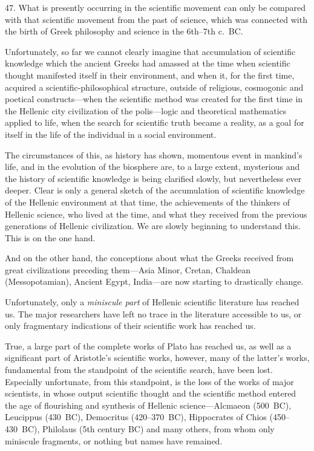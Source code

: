 
47. What is presently occurring in the scientific movement can only be compared
with that scientific movement from the past of science, which was connected
with the birth of Greek philosophy and science in the 6th--7th c.~BC.

Unfortunately, so far we cannot clearly imagine that accumulation of scientific
knowledge which the ancient Greeks had amassed at the time when scientific
thought manifested itself in their environment, and when it, for the first
time, acquired a scientific-philosophical structure, outside of religious,
cosmogonic and poetical constructs---when the scientific method was created for
the first time in the Hellenic city civilization of the polis---logic and
theoretical mathematics applied to life, when the search for scientific truth
became a reality, as a goal for itself in the life of the individual in a
social environment.

The circumstances of this, as history has shown, momentous event in mankind's
life, and in the evolution of the biosphere are, to a large extent, mysterious
and the history of scientific knowledge is being clarified slowly, but
nevertheless ever deeper.  Clear is only a general sketch of the accumulation
of scientific knowledge of the Hellenic environment at that time, the
achievements of the thinkers of Hellenic science, who lived at the time, and
what they received from the previous generations of Hellenic civilization.  We
are slowly beginning to understand this.  This is on the one hand.

And on the other hand, the conceptions about what the Greeks received from
great civilizations preceding them---Asia Minor, Cretan, Chaldean
(Messopotamian), Ancient Egypt, India---are now starting to drastically
change.

Unfortunately, only a \emph{miniscule part} of Hellenic scientific literature
has reached us.  The major researchers have left no trace in the literature
accessible to us, or only fragmentary indications of their scientific work has
reached us.

True, a large part of the complete works of Plato has reached us, as well as a
significant part of Aristotle's scientific works, however, many of the latter's
works, fundamental from the standpoint of the scientific search, have been
lost.  Especially unfortunate, from this standpoint, is the loss of the works
of major scientists, in whose output scientific thought and the scientific
method entered the age of flourishing and synthesis of Hellenic
science---Alcmaeon (500~BC), Leucippus (430~BC), Democritus (420--370~BC),
Hippocrates of Chios (450--430~BC), Philolaus (5th century BC) and many others,
from whom only miniscule fragments, or nothing but names have remained.

